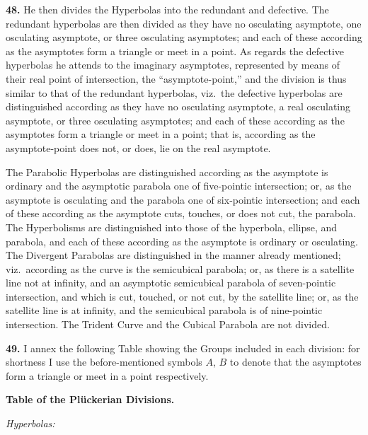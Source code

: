 \documentclass[11pt,a4paper]{article}
\begin{document}
\medskip

\textbf{48.} He then divides the Hyperbolas into the redundant and defective. The redundant hyperbolas are then divided as they have no osculating asymptote, one osculating asymptote, or three osculating asymptotes; and each of these according as the asymptotes form a triangle or meet in a point. As regards the defective hyperbolas he attends to the imaginary asymptotes, represented by means of their real point of intersection, the ``asymptote-point,'' and the division is thus similar to that of the redundant hyperbolas, viz.\ the defective hyperbolas are distinguished according as they have no osculating asymptote, a real osculating asymptote, or three osculating asymptotes; and each of these according as the asymptotes form a triangle or meet in a point; that is, according as the asymptote-point does not, or does, lie on the real asymptote.

The Parabolic Hyperbolas are distinguished according as the asymptote is ordinary and the asymptotic parabola one of five-pointic intersection; or, as the asymptote is osculating and the parabola one of six-pointic intersection; and each of these according as the asymptote cuts, touches, or does not cut, the parabola. The Hyperbolisms are distinguished into those of the hyperbola, ellipse, and parabola, and each of these according as the asymptote is ordinary or osculating. The Divergent Parabolas are distinguished in the manner already mentioned; viz.\ according as the curve is the semicubical parabola; or, as there is a satellite line not at infinity, and an asymptotic semicubical parabola of seven-pointic intersection, and which is cut, touched, or not cut, by the satellite line; or, as the satellite line is at infinity, and the semicubical parabola is of nine-pointic intersection. The Trident Curve and the Cubical Parabola are not divided.

\medskip

\textbf{49.} I annex the following Table showing the Groups included in each division: for shortness I use the before-mentioned symbols $A$, $B$ to denote that the asymptotes form a triangle or meet in a point respectively.

\medskip

\noindent\textbf{Table of the Pl\"uckerian Divisions.}

\smallskip

\noindent\textit{Hyperbolas:}
\smallskip
\end{document}
